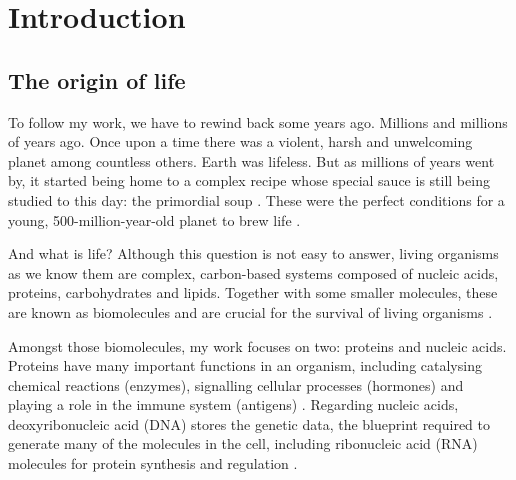 \chapter{Introduction}

\section{The origin of life}

To follow my work, we have to rewind back some years ago. Millions and millions of years ago.
Once upon a time there was a violent, harsh and unwelcoming planet among countless others. Earth was lifeless. But as millions of years went by, it started being home to a complex recipe whose special sauce is still being studied to this day: the primordial soup \cite{gilbert:1986td}. These were the perfect conditions for a young, 500-million-year-old planet to brew life \cite{dalrymple:2001vw,dodd:2017tr}.

And what is life? Although this question is not easy to answer, living organisms as we know them are complex, carbon-based systems composed of nucleic acids, proteins, carbohydrates and lipids. Together with some smaller molecules, these are known as biomolecules and are crucial for the survival of living organisms \cite{alberts:2008vj}.

Amongst those biomolecules, my work focuses on two: proteins and nucleic acids. Proteins have many important functions in an organism, including catalysing chemical reactions (enzymes), signalling cellular processes (hormones) and playing a role in the immune system (antigens) \cite{alberts:2008vj}. Regarding nucleic acids, deoxyribonucleic acid (DNA) stores the genetic data, the blueprint required to generate many of the molecules in the cell, including ribonucleic acid (RNA) molecules for protein synthesis and regulation \cite{alberts:2008vj}.


